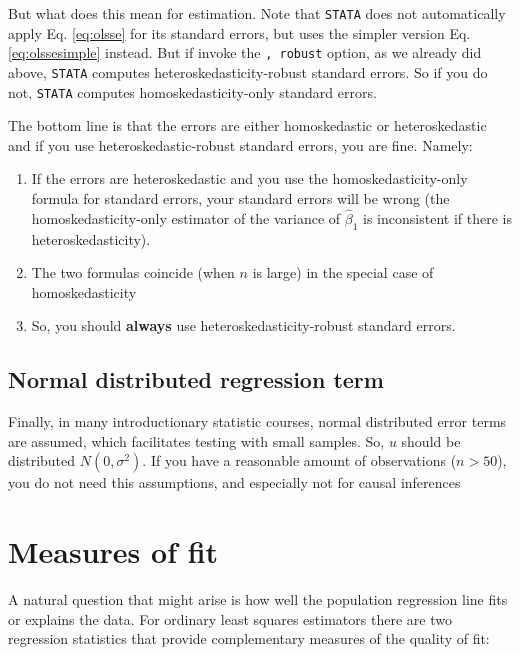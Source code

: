 \documentclass[
]{book}
\providecommand{\tightlist}{%
  \setlength{\itemsep}{0pt}\setlength{\parskip}{0pt}}
\begin{document}
But what does this mean for estimation. Note that \texttt{STATA} does not automatically apply Eq. \eqref{eq:olsse} for its standard errors, but uses the simpler version Eq. \eqref{eq:olssesimple} instead. But if invoke the \texttt{,\ robust} option, as we already did above, \texttt{STATA} computes heteroskedasticity-robust standard errors. So if you do not, \texttt{STATA} computes homoskedasticity-only standard errors.

The bottom line is that the errors are either homoskedastic or heteroskedastic and if you use heteroskedastic-robust standard errors, you are fine. Namely:

\begin{enumerate}
\def\labelenumi{\arabic{enumi}.}
\tightlist
\item
  If the errors are heteroskedastic and you use the homoskedasticity-only formula for standard errors, your standard errors will be wrong (the homoskedasticity-only estimator of the variance of \(\hat{\beta}_1\) is inconsistent if there is heteroskedasticity).
\item
  The two formulas coincide (when \(n\) is large) in the special case of homoskedasticity
\item
  So, you should \textbf{always} use heteroskedasticity-robust standard errors.
\end{enumerate}

\hypertarget{normal-distributed-regression-term}{%
\subsection{Normal distributed regression term}\label{normal-distributed-regression-term}}

Finally, in many introductionary statistic courses, normal distributed error terms are assumed, which facilitates testing with small samples. So, \(u\) should be distributed \(N(0,\sigma^2)\). If you have a reasonable amount of observations (\(n >50\)), you do not need this assumptions, and especially not for causal inferences

\hypertarget{measures-of-fit}{%
\section{Measures of fit}\label{measures-of-fit}}

A natural question that might arise is how well the population regression line fits or explains the data. For ordinary least squares estimators there are two regression statistics that provide complementary measures of the quality of fit:
\end{document}
